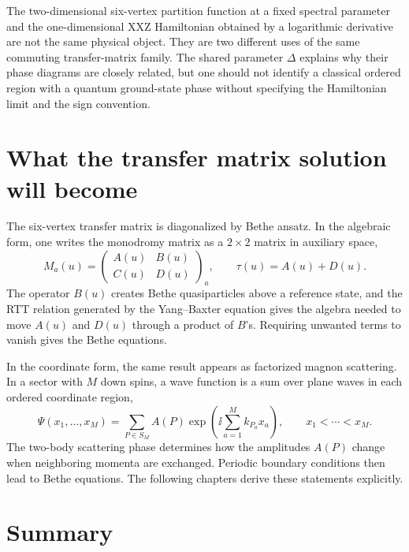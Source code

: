 \begin{remark}
The two-dimensional six-vertex partition function at a fixed spectral parameter
and the one-dimensional XXZ Hamiltonian obtained by a logarithmic derivative are
not the same physical object.  They are two different uses of the same commuting
transfer-matrix family.  The shared parameter $\Delta$ explains why their phase
diagrams are closely related, but one should not identify a classical ordered
region with a quantum ground-state phase without specifying the Hamiltonian limit
and the sign convention.
\end{remark}

\section{What the transfer matrix solution will become}
\label{sec:six-vertex-what-comes-next}

The six-vertex transfer matrix is diagonalized by Bethe ansatz.  In the algebraic
form, one writes the monodromy matrix as a $2\times2$ matrix in auxiliary space,
\begin{equation}
\label{eq:six-vertex-ABA-monodromy-entries}
    M_a(u)=
    \begin{pmatrix}
        A(u)&B(u)\\
        C(u)&D(u)
    \end{pmatrix}_a,
    \qquad
    \tau(u)=A(u)+D(u).
\end{equation}
The operator $B(u)$ creates Bethe quasiparticles above a reference state, and the
RTT relation generated by the Yang--Baxter equation gives the algebra needed to
move $A(u)$ and $D(u)$ through a product of $B$'s.  Requiring unwanted terms to
vanish gives the Bethe equations.

In the coordinate form, the same result appears as factorized magnon scattering.
In a sector with $M$ down spins, a wave function is a sum over plane waves in each
ordered coordinate region,
\begin{equation}
    \Psi(x_1,\ldots,x_M)
    =
    \sum_{P\in S_M}A(P)
    \exp\left(\ii\sum_{a=1}^{M}k_{P_a}x_a\right),
    \qquad
    x_1<\cdots<x_M .
\end{equation}
The two-body scattering phase determines how the amplitudes $A(P)$ change when
neighboring momenta are exchanged.  Periodic boundary conditions then lead to
Bethe equations.  The following chapters derive these statements explicitly.

\section{Summary}
\label{sec:six-vertex-summary}

